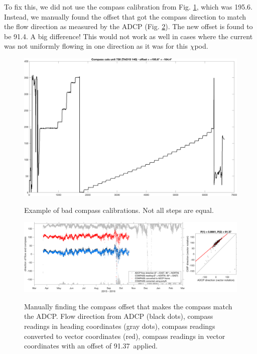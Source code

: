 To fix this, we did not use the compass calibration from Fig. \ref{fig:badcals}, which was 195.6\degree. Instead, we manually found the offset that got the compass direction to match the flow direction as measured by the ADCP (Fig. \ref{fig:findcompassoffset}). The new offset is found to be 91.4\degree. A big difference! This would not work as well in cases where the current was not uniformly flowing in one direction as it was for this $\chi$pod.

\begin{figure}[h]
  \centering \centering\noindent\includegraphics[width=12.5cm,angle=0]{./figs/compass_cals_730.png}\\
    \caption{Example of bad compass calibrations. Not all steps are equal.}\label{fig:badcals}
\end{figure}

\begin{figure}[h]
  \centering \centering\noindent\includegraphics[width=16cm,angle=0]{./figs/compare_ADCP_direction_to_compass.png}\\
    \caption{Manually finding the compass offset that makes the compass match the ADCP. Flow direction from ADCP (black dots), compass readings in heading coordinates (gray dots), compass readings converted to vector coordinates (red), compass readings in vector coordinates with an offset of 91.37\degree \, applied.}\label{fig:findcompassoffset}
\end{figure}

